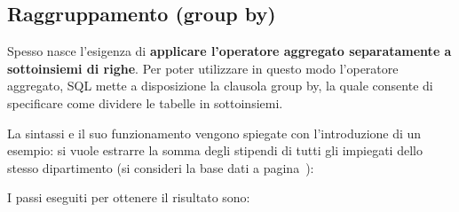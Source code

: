 \documentclass[a4paper]{article}
\begin{document}
	\subsection{Raggruppamento (\textsf{group by})}
	
	Spesso nasce l'esigenza di \textbf{applicare l'operatore aggregato separatamente a sottoinsiemi di righe}. Per poter utilizzare in questo modo l'operatore aggregato, SQL mette a disposizione la clausola \textsf{group by}, la quale consente di specificare come dividere le tabelle in sottoinsiemi.\newline
	
	\noindent
	La sintassi e il suo funzionamento vengono spiegate con l'introduzione di un esempio: si vuole estrarre la somma degli stipendi di tutti gli impiegati dello stesso dipartimento (si consideri la base dati a pagina~\pageref{select dbms}):
	
	I passi eseguiti per ottenere il risultato sono:
\end{document}
